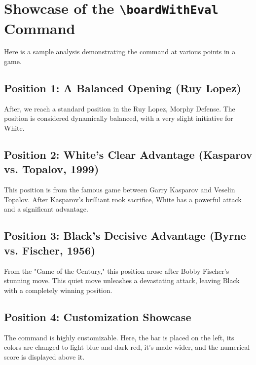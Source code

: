 \documentclass{article}
\begin{document}
\section*{Showcase of the \texttt{\textbackslash boardWithEval} Command}

Here is a sample analysis demonstrating the command at various points in a game.

\subsection*{Position 1: A Balanced Opening (Ruy Lopez)}
After, we reach a standard position in the Ruy Lopez, Morphy Defense. The position is considered dynamically balanced, with a very slight initiative for White.
\begin{center}
\end{center}

\subsection*{Position 2: White's Clear Advantage (Kasparov vs. Topalov, 1999)}
This position is from the famous game between Garry Kasparov and Veselin Topalov. After Kasparov's brilliant rook sacrifice, White has a powerful attack and a significant advantage.
\begin{center}
\end{center}

\subsection*{Position 3: Black's Decisive Advantage (Byrne vs. Fischer, 1956)}
From the "Game of the Century," this position arose after Bobby Fischer's stunning move. This quiet move unleashes a devastating attack, leaving Black with a completely winning position.
\begin{center}
\end{center}

\subsection*{Position 4: Customization Showcase}
The command is highly customizable. Here, the bar is placed on the left, its colors are changed to light blue and dark red, it's made wider, and the numerical score is displayed above it.
\begin{center}
\end{center}
\end{document}
